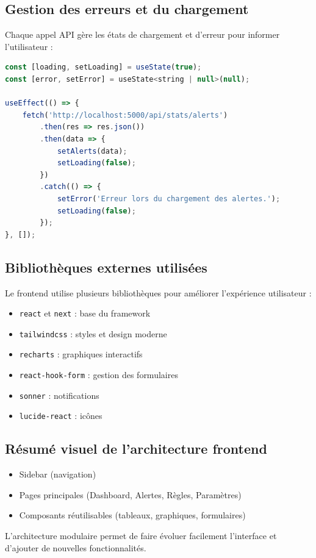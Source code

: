 \documentclass[a4paper,12pt]{article}
\begin{document}
\subsection{Gestion des erreurs et du chargement}
Chaque appel API gère les états de chargement et d'erreur pour informer l'utilisateur :
\begin{lstlisting}[language=JavaScript]
const [loading, setLoading] = useState(true);
const [error, setError] = useState<string | null>(null);

useEffect(() => {
    fetch('http://localhost:5000/api/stats/alerts')
        .then(res => res.json())
        .then(data => {
            setAlerts(data);
            setLoading(false);
        })
        .catch(() => {
            setError('Erreur lors du chargement des alertes.');
            setLoading(false);
        });
}, []);
\end{lstlisting}

\subsection{Bibliothèques externes utilisées}
Le frontend utilise plusieurs bibliothèques pour améliorer l'expérience utilisateur :
\begin{itemize}
  \item \texttt{react} et \texttt{next} : base du framework
  \item \texttt{tailwindcss} : styles et design moderne
  \item \texttt{recharts} : graphiques interactifs
  \item \texttt{react-hook-form} : gestion des formulaires
  \item \texttt{sonner} : notifications
  \item \texttt{lucide-react} : icônes
\end{itemize}

\subsection{Résumé visuel de l'architecture frontend}
\begin{itemize}
  \item Sidebar (navigation)
  \item Pages principales (Dashboard, Alertes, Règles, Paramètres)
  \item Composants réutilisables (tableaux, graphiques, formulaires)
\end{itemize}

L'architecture modulaire permet de faire évoluer facilement l'interface et d'ajouter de nouvelles fonctionnalités.

\end{document}
